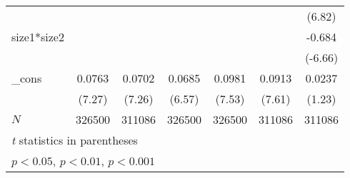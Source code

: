 {\begin{tabular}{l*{6}{c}}
            &                     &                     &                     &                     &                     &      (6.82)         \\
[1em]
size1*size2&                     &                     &                     &                     &                     &      -0.684\sym{***}\\
            &                     &                     &                     &                     &                     &     (-6.66)         \\
[1em]
\_cons      &      0.0763\sym{***}&      0.0702\sym{***}&      0.0685\sym{***}&      0.0981\sym{***}&      0.0913\sym{***}&      0.0237         \\
            &      (7.27)         &      (7.26)         &      (6.57)         &      (7.53)         &      (7.61)         &      (1.23)         \\
\hline
\(N\)       &      326500         &      311086         &      326500         &      326500         &      311086         &      311086         \\
\hline\hline
\multicolumn{7}{l}{\footnotesize \textit{t} statistics in parentheses}\\
\multicolumn{7}{l}{\footnotesize \sym{*} \(p<0.05\), \sym{**} \(p<0.01\), \sym{***} \(p<0.001\)}\\
\end{tabular}
}
